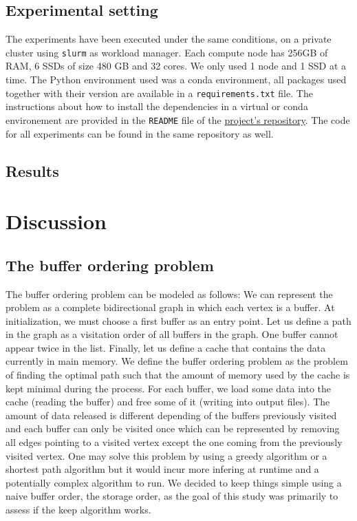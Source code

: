 \documentclass[conference]{IEEEtran}
\begin{document}
\subsection{Experimental setting}
The experiments have been executed under the same conditions, on a private
cluster using \texttt{slurm} as workload manager. Each compute node has 256GB of
RAM, 6 SSDs of size 480 GB and 32 cores. We only used 1 node and 1 SSD at a
time. The Python environment used was a
conda environment, all packages used together with their version are available
in a \texttt{requirements.txt} file. The instructions about how to install the
dependencies in a virtual or
conda environement are provided in the \texttt{README} file of the
\href{https://github.com/GTimothee/repartition_experiments}{project's repository}. The
code for all experiments can be found in the same repository as well.

\subsection{Results}

\section{Discussion}

\subsection{The buffer ordering problem}
The buffer ordering problem can be modeled as follows: We can represent the
problem as a complete bidirectional graph in which each vertex is a buffer. At
initialization, we must choose a first buffer as an entry point. Let us define
a path in the graph as a visitation order of all buffers in the graph. One buffer
cannot appear twice in the list. Finally, let us define a cache that contains
the data currently in main memory. We define the buffer ordering problem as the
problem of finding the optimal path such that the amount of memory used by the
cache is kept minimal during the process. For each buffer, we load some data
into the cache (reading the buffer) and free some of it (writing into output files).
The amount of
data released is different depending of the buffers previously visited and each
buffer can only be visited once which can be represented by removing all edges
pointing to a visited vertex except the one coming from the previously visited
vertex. One may solve this problem by using a greedy algorithm or a shortest path
algorithm but it would
incur more infering at runtime and a potentially complex algorithm to run.
We decided to keep things simple using a naive buffer order, the storage order,
as the goal of this study was primarily to assess if the keep algorithm works.
\end{document}
